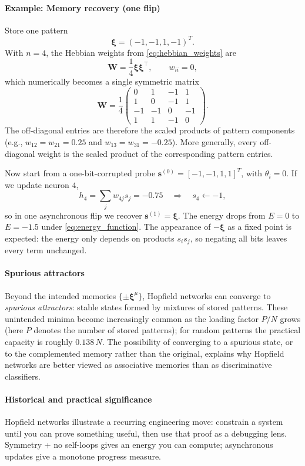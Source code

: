 \paragraph{Example: Memory recovery (one flip)}

Store one pattern
\[
\mathbf{\xi} = (-1, -1, 1, -1)^T.
\]
With \(n=4\), the Hebbian weights from \eqref{eq:hebbian_weights} are
\[
\mathbf{W} = \frac{1}{4} \mathbf{\xi} \mathbf{\xi}^\top, \qquad w_{ii} = 0,
\]
which numerically becomes a single symmetric matrix
\[
\mathbf{W} = \frac{1}{4}
\begin{pmatrix}
0 & 1 & -1 & 1 \\
1 & 0 & -1 & 1 \\
-1 & -1 & 0 & -1 \\
1 & 1 & -1 & 0
\end{pmatrix}.
\]
The off-diagonal entries are therefore the scaled products of pattern components (e.g., $w_{12}=w_{21}=0.25$ and $w_{13}=w_{31}=-0.25$).
More generally, every off-diagonal weight is the scaled product of the corresponding pattern entries.

Now start from a one-bit-corrupted probe \(\mathbf{s}^{(0)}=[-1,-1,1,1]^T\), with \(\theta_i=0\). If we update neuron \(4\),
\[
h_4=\sum_j w_{4j}s_j = -0.75 \quad\Rightarrow\quad s_4\leftarrow -1,
\]
so in one asynchronous flip we recover \(\mathbf{s}^{(1)}=\mathbf{\xi}\). The energy drops from \(E=0\) to \(E=-1.5\) under \eqref{eq:energy_function}. The appearance of \(-\mathbf{\xi}\) as a fixed point is expected: the energy only depends on products \(s_i s_j\), so negating all bits leaves every term unchanged.

\paragraph{Spurious attractors}

Beyond the intended memories \(\{\pm \mathbf{\xi}^\mu\}\), Hopfield networks can converge to \emph{spurious attractors}: stable states formed by mixtures of stored patterns. These unintended minima become increasingly common as the loading factor \(P/N\) grows (here \(P\) denotes the number of stored patterns); for random patterns the practical capacity is roughly \(0.138\, N\). The possibility of converging to a spurious state, or to the complemented memory rather than the original, explains why Hopfield networks are better viewed as associative memories than as discriminative classifiers.

\paragraph{Historical and practical significance}
Hopfield networks illustrate a recurring engineering move: constrain a system until you can prove something useful, then use that proof as a debugging lens. Symmetry + no self-loops gives an energy you can compute; asynchronous updates give a monotone progress measure.

